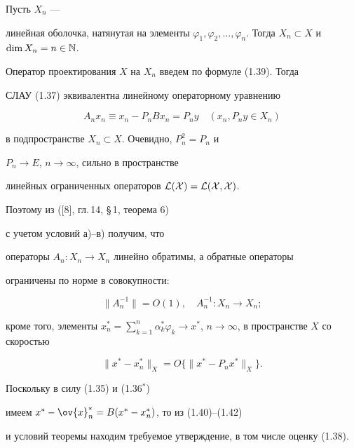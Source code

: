 \begin{pf}


Пусть $X_n$ ---


линейная оболочка, натянутая на элементы $\varphi_1,\varphi_2,


\dotsc ,\varphi_n$. Тогда $X_n\subset X$ и $\dim X_n=n\in \bl{N}$.


Оператор проектирования $X$ на $X_n$ введем по формуле (1.39). Тогда


СЛАУ (1.37) эквивалентна линейному операторному уравнению


\begin{equation}


A_nx_n\equiv x_n-P_nBx_n=P_ny\quad (x_n,P_ny\in X_n)


\end{equation}


в подпространстве $X_n\subset X$. Очевидно, $P_n^2=P_n$ и


$P_n\rightarrow E$, $n\rightarrow \infty$, сильно в пространстве


линейных ограниченных операторов $\cal L(X)=\cal L(X,X)$.


Поэтому из ([8], гл.\,14, \S\,1, теорема 6) 


с учетом условий а)--в) получим, что


операторы $A_n:X_n\rightarrow X_n$ линейно обратимы, а обратные операторы


ограничены по норме в совокупности:


\begin{equation}


\|A_n^{-1}\|=O(1),\quad A_n^{-1}:X_n\rightarrow X_n;


\end{equation}


кроме того, элементы $x^*_n=\sum\limits_{k=1}^n\alpha_k^*\varphi_k\rightarrow


x^*$, $n\rightarrow \infty$, в пространстве $X$ со скоростью


\begin{equation}


\|x^*-x_n^*\|_X=O\{ \|x^*-P_nx^*\|_X\}.


\end{equation}


Поскольку в силу (1.35) и (1.36$^*$)


имеем $x^*-\ov{x}_n^*=B(x^*-x^*_n)$, то из (1.40)--(1.42)


и условий теоремы находим требуемое утверждение, в том числе оценку (1.38).


\end{pf}





